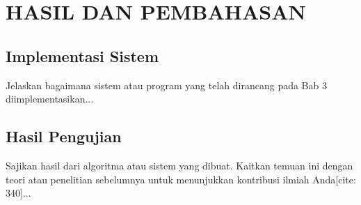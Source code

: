 \chapter{HASIL DAN PEMBAHASAN}


\section{Implementasi Sistem}
Jelaskan bagaimana sistem atau program yang telah dirancang pada Bab 3 diimplementasikan...

\section{Hasil Pengujian}
Sajikan hasil dari algoritma atau sistem yang dibuat. Kaitkan temuan ini dengan teori atau penelitian sebelumnya untuk menunjukkan kontribusi ilmiah Anda[cite: 340]...